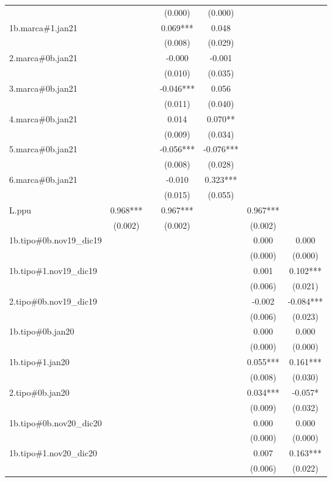 \begin{tabular}{lcccccc}
 &  &  & (0.000) & (0.000) &  &  \\
1b.marca\#1.jan21 &  &  & 0.069*** & 0.048 &  &  \\
 &  &  & (0.008) & (0.029) &  &  \\
2.marca\#0b.jan21 &  &  & -0.000 & -0.001 &  &  \\
 &  &  & (0.010) & (0.035) &  &  \\
3.marca\#0b.jan21 &  &  & -0.046*** & 0.056 &  &  \\
 &  &  & (0.011) & (0.040) &  &  \\
4.marca\#0b.jan21 &  &  & 0.014 & 0.070** &  &  \\
 &  &  & (0.009) & (0.034) &  &  \\
5.marca\#0b.jan21 &  &  & -0.056*** & -0.076*** &  &  \\
 &  &  & (0.008) & (0.028) &  &  \\
6.marca\#0b.jan21 &  &  & -0.010 & 0.323*** &  &  \\
 &  &  & (0.015) & (0.055) &  &  \\
L.ppu & 0.968*** &  & 0.967*** &  & 0.967*** &  \\
 & (0.002) &  & (0.002) &  & (0.002) &  \\
1b.tipo\#0b.nov19\_dic19 &  &  &  &  & 0.000 & 0.000 \\
 &  &  &  &  & (0.000) & (0.000) \\
1b.tipo\#1.nov19\_dic19 &  &  &  &  & 0.001 & 0.102*** \\
 &  &  &  &  & (0.006) & (0.021) \\
2.tipo\#0b.nov19\_dic19 &  &  &  &  & -0.002 & -0.084*** \\
 &  &  &  &  & (0.006) & (0.023) \\
1b.tipo\#0b.jan20 &  &  &  &  & 0.000 & 0.000 \\
 &  &  &  &  & (0.000) & (0.000) \\
1b.tipo\#1.jan20 &  &  &  &  & 0.055*** & 0.161*** \\
 &  &  &  &  & (0.008) & (0.030) \\
2.tipo\#0b.jan20 &  &  &  &  & 0.034*** & -0.057* \\
 &  &  &  &  & (0.009) & (0.032) \\
1b.tipo\#0b.nov20\_dic20 &  &  &  &  & 0.000 & 0.000 \\
 &  &  &  &  & (0.000) & (0.000) \\
1b.tipo\#1.nov20\_dic20 &  &  &  &  & 0.007 & 0.163*** \\
 &  &  &  &  & (0.006) & (0.022) \\

\end{tabular}
